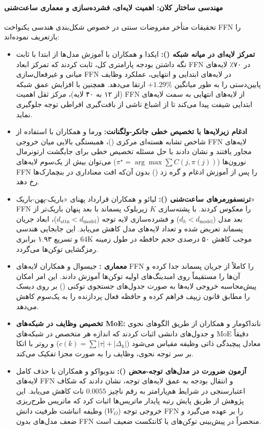 \paragraph*{مهندسی ساختار کلان: اهمیت لایه‌ای، فشرده‌سازی و معماری ساعت‌شنی}
تحقیقات متأخر مفروضات سنتی در خصوص شکل‌بندی هندسی یکنواخت FFN را بازتعریف نموده‌اند:
\begin{itemize}
    \item \textbf{تمرکز لایه‌ای در میانه شبکه ():} ایکدا و همکاران \cite{ikeda2025layerwise} با آموزش مدل‌ها از ابتدا با ثابت نگه داشتن بودجه پارامتری کل، ثابت کردند که تمرکز ابعاد FFN در ۷۰٪ لایه‌های میانی و غیرفعال‌سازی FFN در لایه‌های ابتدایی و انتهایی، عملکرد وظایف پایین‌دستی را به طور میانگین $+1.29\%$ ارتقا می‌دهد. همچنین با افزایش عمق شبکه (از ۱۲ به ۴۰ لایه)، مرکز ثقل اهمیت FFN از لایه‌های انتهایی به سمت لایه‌های ابتدایی شیفت پیدا می‌کند تا از اشباع ناشی از بافت‌گیری افراطی توجه جلوگیری نماید.
    \item \textbf{ادغام زیرلایه‌ها با تخصیص خطی جانکر-ولگنانت:} ورما و همکاران \cite{verma2025merging} با استفاده از شاخص تشابه هسته‌ای مرکزی ()، همبستگی بالایی میان خروجی FFN لایه‌های مجاور یافتند و نشان دادند با حل مسئله تخصیص خطی برای جایگشت ارتونرمال نورون‌ها ($\pi^\star = \arg\max \sum C(j, \pi(j))$) می‌توان بیش از یک‌سوم لایه‌های FFN را پس از آموزش ادغام و گره زد () بدون آن‌که افت معناداری در بنچمارک‌ها رخ دهد.
    \item \textbf{ترنسفورمرهای ساعت‌شنی ():} لیائو و همکاران \cite{liao2026revisiting} قرارداد پهنای «باریک-پهن-باریک» FFN را معکوس کردند. با پشته‌سازی $K$ زیربلوک پسماند با بعد پنهان باریک‌تر از بعد مدل ($d_h < d_{\text{model}}$) و فشرده‌سازی لایه توجه ($d_{\text{attn}} < d_{\text{model}}$)، ابعاد جریان پسماند تعریض شده و تعداد لایه‌های مدل کاهش می‌یابد. این جابجایی هندسی موجب کاهش ۵۰ درصدی حجم حافظه  در طول زمینه $64\text{K}$ و تسریع ۱.۹۳ برابری رمزگشایی توکن‌ها می‌گردد.
    \item \textbf{معماری :} جیسوال و همکاران \cite{jaiswal2026memoryllm} لایه‌های FFN را کاملاً از جریان پسماند جدا کرده و آن‌ها را مستقیماً روی امبدینگ‌های اولیه توکن‌ها آموزش دادند. این امر امکان پیش‌محاسبه خروجی لایه‌ها به صورت جدول‌های جستجوی توکنی () بر روی دیسک را مطابق قانون زیپف فراهم کرده و حافظه فعال پردازنده را به یک‌سوم کاهش می‌دهد.
    \item \textbf{تخصیص وظایف در شبکه‌های MoE:} نانداکومار و همکاران \cite{nandakumar2026theoretical} از طریق الگوهای نحوی و جدول‌های دانشی اثبات کردند که اندازه هر متخصص در شبکه‌های MoE دقیقاً معادل پیچیدگی ذاتی وظیفه مقیاس می‌شود ($c(k) = \sum |\tau| + |\Delta_k|$) و روتر با اتکا بر سر توجه نحوی، وظایف را به صورت مجزا تفکیک می‌کند.
    \item \textbf{آزمون ضرورت در مدل‌های توجه-محض ():} ندوبواکو و همکاران \cite{ndubuaku2026controlled} با حذف کامل لایه‌های FFN و انتقال بودجه به عمق لایه‌های توجه، نشان دادند که شکاف اعتبارسنجی در شرایط هم‌پارامتر به رقم ناچیز $0.0055$ نات کاهش می‌یابد. این پژوهش از طریق پایش رتبه پایدار ماتریس‌ها اثبات کرد که ماتریس طرح‌ریزی خروجی توجه ($W_O$) وظیفه انباشت ظرفیت دانش FFN را بر عهده می‌گیرد و ضعف مدل‌های بدون FFN منحصراً در پیش‌بینی توکن‌های با کانتکست ضعیف است.
\end{itemize}

